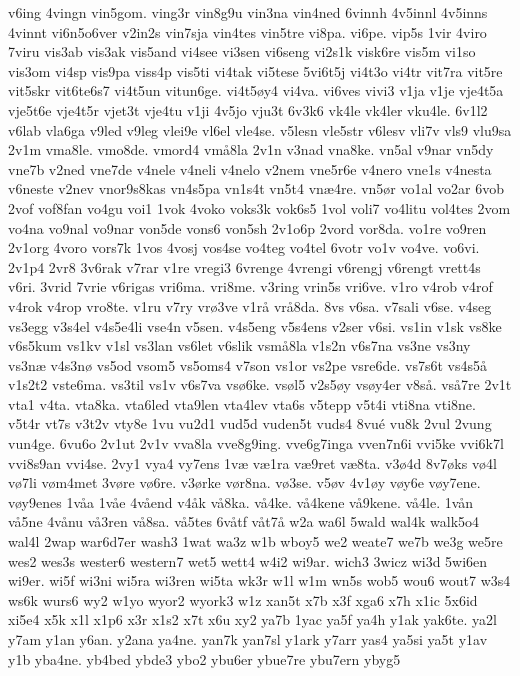{v6ing
4vingn
vin5gom.
ving3r
vin8g9u
vin3na
vin4ned
6vinnh
4v5innl
4v5inns
4vinnt
vi6n5o6ver
v2in2s
vin7sja
vin4tes
vin5tre
vi8pa.
vi6pe.
vip5s
1vir
4viro
7viru
vis3ab
vis3ak
vis5and
vi4see
vi3sen
vi6seng
vi2s1k
visk6re
vis5m
vi1so
vis3om
vi4sp
vis9pa
viss4p
vis5ti
vi4tak
vi5tese
5vi6t5j
vi4t3o
vi4tr
vit7ra
vit5re
vit5skr
vit6te6s7
vi4t5un
vitun6ge.
vi4t5øy4
vi4va.
vi6ves
vivi3
v1ja
v1je
vje4t5a
vje5t6e
vje4t5r
vjet3t
vje4tu
v1ji
4v5jo
vju3t
6v3k6
vk4le
vk4ler
vku4le.
6v1l2
v6lab
vla6ga
v9led
v9leg
vlei9e
vl6el
vle4se.
v5lesn
vle5str
v6lesv
vli7v
vls9
vlu9sa
2v1m
vma8le.
vmo8de.
vmord4
vmå8la
2v1n
v3nad
vna8ke.
vn5al
v9nar
vn5dy
vne7b
v2ned
vne7de
v4nele
v4neli
v4nelo
v2nem
vne5r6e
v4nero
vne1s
v4nesta
v6neste
v2nev
vnor9s8kas
vn4s5pa
vn1s4t
vn5t4
vnæ4re.
vn5ør
vo1al
vo2ar
6vob
2vof
vof8fan
vo4gu
voi1
1vok
4voko
voks3k
vok6s5
1vol
voli7
vo4litu
vol4tes
2vom
vo4na
vo9nal
vo9nar
von5de
vons6
von5sh
2v1o6p
2vord
vor8da.
vo1re
vo9ren
2v1org
4voro
vors7k
1vos
4vosj
vos4se
vo4teg
vo4tel
6votr
vo1v
vo4ve.
vo6vi.
2v1p4
2vr8
3v6rak
v7rar
v1re
vregi3
6vrenge
4vrengi
v6rengj
v6rengt
vrett4s
v6ri.
3vrid
7vrie
v6rigas
vri6ma.
vri8me.
v3ring
vrin5s
vri6ve.
v1ro
v4rob
v4rof
v4rok
v4rop
vro8te.
v1ru
v7ry
vrø3ve
v1rå
vrå8da.
8vs
v6sa.
v7sali
v6se.
v4seg
vs3egg
v3s4el
v4s5e4li
vse4n
v5sen.
v4s5eng
v5s4ens
v2ser
v6si.
vs1in
v1sk
vs8ke
v6s5kum
vs1kv
v1sl
vs3lan
vs6let
v6slik
vsmå8la
v1s2n
v6s7na
vs3ne
vs3ny
vs3næ
v4s3nø
vs5od
vsom5
vs5oms4
v7son
vs1or
vs2pe
vsre6de.
vs7s6t
vs4s5å
v1s2t2
vste6ma.
vs3til
vs1v
v6s7va
vsø6ke.
vsøl5
v2s5øy
vsøy4er
v8så.
vså7re
2v1t
vta1
v4ta.
vta8ka.
vta6led
vta9len
vta4lev
vta6s
v5tepp
v5t4i
vti8na
vti8ne.
v5t4r
vt7s
v3t2v
vty8e
1vu
vu2d1
vud5d
vuden5t
vuds4
8vué
vu8k
2vul
2vung
vun4ge.
6vu6o
2v1ut
2v1v
vva8la
vve8g9ing.
vve6g7inga
vven7n6i
vvi5ke
vvi6k7l
vvi8s9an
vvi4se.
2vy1
vya4
vy7ens
1væ
væ1ra
væ9ret
væ8ta.
v3ø4d
8v7øks
vø4l
vø7li
vøm4met
3vøre
vø6re.
v3ørke
vør8na.
vø3se.
v5øv
4v1øy
vøy6e
vøy7ene.
vøy9enes
1våa
1våe
4våend
v4åk
vå8ka.
vå4ke.
vå4kene
vå9kene.
vå4le.
1vån
vå5ne
4vånu
vå3ren
vå8sa.
vå5tes
6våtf
våt7å
w2a
wa6l
5wald
wal4k
walk5o4
wal4l
2wap
war6d7er
wash3
1wat
wa3z
w1b
wboy5
we2
weate7
we7b
we3g
we5re
wes2
wes3s
wester6
western7
wet5
wett4
w4i2
wi9ar.
wich3
3wicz
wi3d
5wi6en
wi9er.
wi5f
wi3ni
wi5ra
wi3ren
wi5ta
wk3r
w1l
w1m
wn5s
wob5
wou6
wout7
w3s4
ws6k
wurs6
wy2
w1yo
wyor2
wyork3
w1z
xan5t
x7b
x3f
xga6
x7h
x1ic
5x6id
xi5e4
x5k
x1l
x1p6
x3r
x1s2
x7t
x6u
xy2
ya7b
1yac
ya5f
ya4h
y1ak
yak6te.
ya2l
y7am
y1an
y6an.
y2ana
ya4ne.
yan7k
yan7sl
y1ark
y7arr
yas4
ya5si
ya5t
y1av
y1b
yba4ne.
yb4bed
ybde3
ybo2
ybu6er
ybue7re
ybu7ern
ybyg5
}

